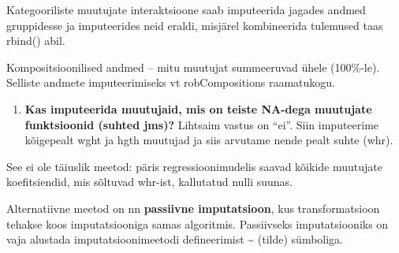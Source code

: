 \documentclass[]{book}
\newenvironment{Shaded}{\begin{snugshade}}{\end{snugshade}}
\newcommand{\DataTypeTok}[1]{\textcolor[rgb]{0.13,0.29,0.53}{#1}}
\newcommand{\DecValTok}[1]{\textcolor[rgb]{0.00,0.00,0.81}{#1}}
\newcommand{\KeywordTok}[1]{\textcolor[rgb]{0.13,0.29,0.53}{\textbf{#1}}}
\newcommand{\NormalTok}[1]{#1}
\newcommand{\OperatorTok}[1]{\textcolor[rgb]{0.81,0.36,0.00}{\textbf{#1}}}
\newcommand{\OtherTok}[1]{\textcolor[rgb]{0.56,0.35,0.01}{#1}}
\newcommand{\StringTok}[1]{\textcolor[rgb]{0.31,0.60,0.02}{#1}}
\providecommand{\tightlist}{%
  \setlength{\itemsep}{0pt}\setlength{\parskip}{0pt}}
\begin{document}
Kategooriliste muutujate interaktsioone saab imputeerida jagades andmed gruppidesse ja imputeerides neid eraldi, misjärel kombineerida tulemused taas rbind() abil.

Kompositsioonilised andmed -- mitu muutujat summeeruvad ühele (100\%-le). Selliste andmete imputeerimiseks vt robCompositions raamatukogu.

\begin{enumerate}
\def\labelenumi{\arabic{enumi}.}
\setcounter{enumi}{3}
\tightlist
\item
  \textbf{Kas imputeerida muutujaid, mis on teiste NA-dega muutujate funktsioonid (suhted jms)?} Lihtsaim vastus on ``ei''. Siin imputeerime kõigepealt wght ja hgth muutujad ja siis arvutame nende pealt suhte (whr).
\end{enumerate}

\begin{Shaded}
\end{Shaded}

See ei ole täiuslik meetod: päris regressioonimudelis saavad kõikide muutujate koefitsiendid, mis sõltuvad whr-ist, kallutatud nulli suunas.

Alternatiivne meetod on nn \textbf{passiivne imputatsioon}, kus transformatsioon tehakse koos imputatsiooniga samas algoritmis. Passiivseks imputatsiooniks on vaja alustada imputatsioonimeetodi defineerimist \textasciitilde{} (tilde) sümboliga.
\end{document}
